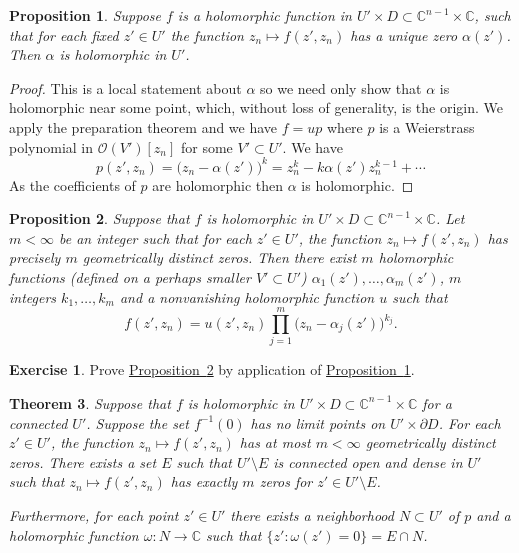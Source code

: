 \documentclass[12pt,openany]{book}
\newcommand{\C}{{\mathbb{C}}}
\newcommand{\sO}{{\mathcal{O}}}
\theoremstyle{plain}
\newtheorem{thm}{Theorem}[section]
\newtheorem{prop}[thm]{Proposition}
\theoremstyle{remark}
\theoremstyle{definition}
\theoremstyle{exercise}
\newtheorem{exercise}{Exercise}[section]
\theoremstyle{example}
\newcommand{\propref}[1]{\hyperref[#1]{Proposition~\ref*{#1}}}
\begin{document}
\begin{prop} \label{prop:roothol}
Suppose $f$ is a holomorphic function in $U' \times D \subset \C^{n-1}
\times \C$, such that for each fixed $z' \in U'$ the function
$z_n \mapsto f(z',z_n)$ has a unique zero $\alpha(z')$.  Then $\alpha$ is
holomorphic in $U'$.
\end{prop}

\begin{proof}
This is a local statement about $\alpha$ so we need only show
that $\alpha$ is holomorphic near some point, which, without loss
of generality, is the origin.
We apply the preparation
theorem and we have $f = u p$
where $p$ is a
Weierstrass polynomial in $\sO(V')[z_n]$ for some $V' \subset U'$.
We have
\begin{equation}
p(z',z_n) = {\bigl(z_n-\alpha(z') \bigr)}^k = z_n^k - k \alpha(z') z_n^{k-1}
+ \cdots
\end{equation}
As the coefficients of $p$ are holomorphic then $\alpha$ is holomorphic.
\end{proof}

\begin{prop} \label{prop:rootshol}
Suppose that $f$ is holomorphic in $U' \times D \subset \C^{n-1} \times \C$.
Let $m < \infty$ be an integer such that
for each $z' \in U'$, the function $z_n \mapsto f(z',z_n)$ has
precisely $m$ geometrically distinct zeros.
Then there exist $m$ holomorphic functions (defined on a perhaps
smaller $V' \subset U'$)
$\alpha_1(z'),\ldots,\alpha_m(z')$, $m$ integers $k_1,\ldots,k_m$
and a nonvanishing holomorphic function $u$
such that
\begin{equation*}
f(z',z_n) = u(z',z_n) \prod_{j=1}^m {\bigl( z_n - \alpha_j(z') \bigr)}^{k_j}
.
\end{equation*}
\end{prop}

\begin{exercise}
Prove \propref{prop:rootshol} by application of
\propref{prop:roothol}.
\end{exercise}

\begin{thm} \label{thm:discrthm}
Suppose that $f$ is holomorphic in $U' \times D \subset \C^{n-1} \times \C$
for a connected $U'$.
Suppose the set $f^{-1}(0)$ has no limit points on $U' \times \partial D$.
For each $z' \in U'$, the function $z_n \mapsto f(z',z_n)$ has
at most $m < \infty$ geometrically distinct zeros.  There exists a
set $E$ such that
$U' \setminus E$ is connected open and dense in $U'$ such that 
$z_n \mapsto f(z',z_n)$ has exactly $m$ zeros for $z' \in U' \setminus E$.

Furthermore, for each point $z' \in U'$ there exists a neighborhood $N
\subset U'$ of $p$
and a holomorphic function $\omega \colon N \to \C$ such that
$\{ z' : \omega(z') = 0 \} = E \cap N$.
\end{thm}
\end{document}
